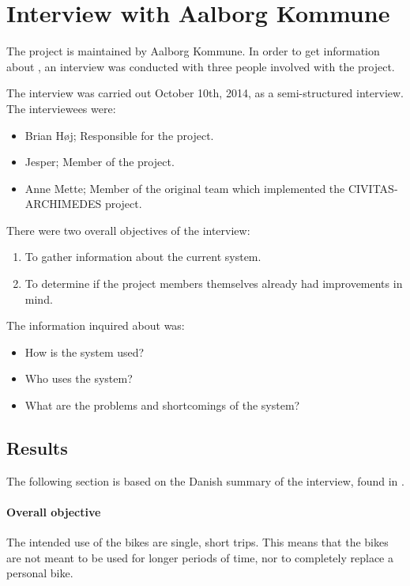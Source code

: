 \section{Interview with Aalborg Kommune}
The \citybike project is maintained by Aalborg Kommune.
In order to get information about \citybike, an interview was conducted with three people involved with the project.

The interview was carried out October 10th, 2014, as a semi-structured interview.
The interviewees were:
\begin{itemize}
\item Brian Høj; Responsible for the \citybike project.
\item Jesper; Member of the \citybike project.
\item Anne Mette; Member of the original team which implemented the CIVITAS-ARCHIMEDES project\cite{aalborgbycyklenbagcyklen}.
\end{itemize}

\noindent There were two overall objectives of the interview:
\begin{enumerate}
\item To gather information about the current system.
\item To determine if the project members themselves already had improvements in mind.
\end{enumerate}

The information inquired about was:
\begin{itemize}
\item How is the system used?
\item Who uses the system?
\item What are the problems and shortcomings of the system?
\end{itemize}


\subsection{Results} \label{interview:goals}
The following section is based on the Danish summary of the interview, found in .

\paragraph{Overall objective}
The intended use of the bikes are single, short trips.
This means that the bikes are not meant to be used for longer periods of time, nor to completely replace a personal bike.

